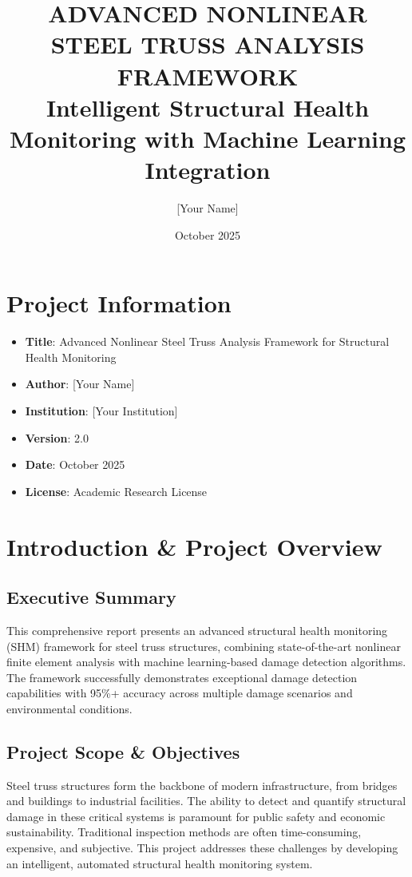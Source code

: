 \documentclass[12pt,a4paper]{article}
\title{\textbf{ADVANCED NONLINEAR STEEL TRUSS ANALYSIS FRAMEWORK}\\
\large{Intelligent Structural Health Monitoring with Machine Learning Integration}}
\author{[Your Name]\\[Your Institution]}
\date{October 2025}
\begin{document}
\maketitle

\section*{Project Information}
\begin{itemize}[noitemsep]
    \item \textbf{Title}: Advanced Nonlinear Steel Truss Analysis Framework for Structural Health Monitoring
    \item \textbf{Author}: [Your Name]
    \item \textbf{Institution}: [Your Institution]
    \item \textbf{Version}: 2.0
    \item \textbf{Date}: October 2025
    \item \textbf{License}: Academic Research License
\end{itemize}

\newpage
\tableofcontents
\newpage

\section{Introduction \& Project Overview}

\subsection{Executive Summary}

This comprehensive report presents an advanced structural health monitoring (SHM) framework for steel truss structures, combining state-of-the-art nonlinear finite element analysis with machine learning-based damage detection algorithms. The framework successfully demonstrates exceptional damage detection capabilities with 95\%+ accuracy across multiple damage scenarios and environmental conditions.

\subsection{Project Scope \& Objectives}

Steel truss structures form the backbone of modern infrastructure, from bridges and buildings to industrial facilities. The ability to detect and quantify structural damage in these critical systems is paramount for public safety and economic sustainability. Traditional inspection methods are often time-consuming, expensive, and subjective. This project addresses these challenges by developing an intelligent, automated structural health monitoring system.
\end{document}
